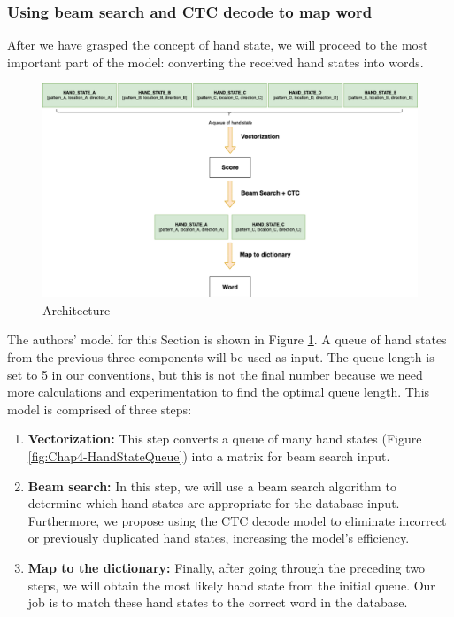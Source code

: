 \subsubsection{ Using beam search and CTC decode to map word}

After we have grasped the concept of hand state, we will proceed to the most important part of the model: converting the received hand states into words.      

\begin{figure}[H]
  \centering
  \includegraphics[width=\textwidth]{img/Chap4/Architechture.png}
  \caption{Architecture}
  \label{fig:Chap4-Architechture}
\end{figure}

The authors' model for this Section is shown in Figure \ref{fig:Chap4-Architechture}. A queue of hand states from the previous three components will be used as input. The queue length is set to 5 in our conventions, but this is not the final number because we need more calculations and experimentation to find the optimal queue length. This model is comprised of three steps:

\begin{enumerate}
  \item \textbf{Vectorization:} This step converts a queue of many hand states (Figure \ref{fig:Chap4-HandStateQueue}) into a matrix for beam search input.
  \item \textbf{Beam search:} In this step, we will use a beam search algorithm to determine which hand states are appropriate for the database input. Furthermore, we propose using the CTC decode model to eliminate incorrect or previously duplicated hand states, increasing the model's efficiency.
  \item \textbf{Map to the dictionary:} Finally, after going through the preceding two steps, we will obtain the most likely hand state from the initial queue. Our job is to match these hand states to the correct word in the database.
\end{enumerate}
      

